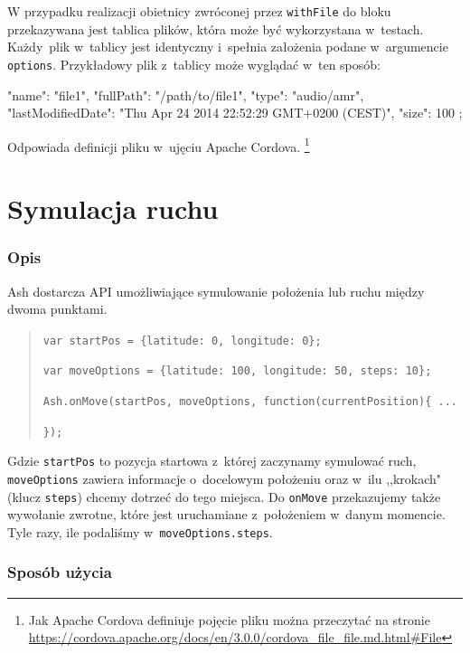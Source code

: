 \documentclass{xmgr}
\begin{document}
W przypadku realizacji obietnicy zwróconej przez \texttt{withFile} do bloku przekazywana jest tablica plików, która może być wykorzystana w~testach. Każdy~plik w~tablicy jest identyczny i~spełnia założenia podane w~argumencie \texttt{options}. Przykładowy plik z~tablicy może wyglądać w~ten sposób:

\begin{javascriptcode}
   {
       "name": "file1",
       "fullPath": "/path/to/file1",
       "type": "audio/amr",
       "lastModifiedDate": 
            "Thu Apr 24 2014 22:52:29 GMT+0200 (CEST)",
       "size": 100
   };
\end{javascriptcode}

Odpowiada definicji pliku w~ujęciu Apache Cordova. 
\footnote{Jak Apache Cordova definiuje pojęcie pliku można przeczytać na stronie \url{https://cordova.apache.org/docs/en/3.0.0/cordova_file_file.md.html\#File} }

\section{Symulacja ruchu}

\subsubsection{Opis}
Ash dostarcza API umożliwiające symulowanie położenia lub ruchu między dwoma punktami.

\begin{quote}
  \texttt{var startPos = \{latitude: 0, longitude: 0\};}

  \texttt{var moveOptions = \{latitude: 100, longitude: 50, steps: 10\};}

  \texttt{Ash.onMove(startPos, moveOptions, function(currentPosition)\{ ... }

  \texttt{\});  }
\end{quote}

Gdzie \texttt{startPos} to pozycja startowa z~której zaczynamy symulować ruch, \texttt{moveOptions} zawiera informacje o~docelowym położeniu oraz w~ilu ,,krokach" (klucz \texttt{steps}) chcemy dotrzeć do tego miejsca. Do \texttt{onMove} przekazujemy także wywołanie zwrotne, które jest uruchamiane z~położeniem w~danym momencie. Tyle razy, ile podaliśmy w~\texttt{moveOptions.steps}. 

\subsubsection{Sposób użycia}
\end{document}
